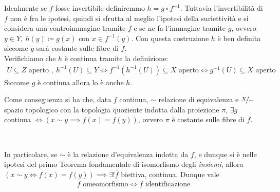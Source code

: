 \begin{demonstration}
	Idealmente se $f$ fosse invertibile definiremmo $h=g\circ f^{-1}$. Tuttavia l'invertibilità di $f$ non è fra le ipotesi, quindi si sfrutta al meglio l'ipotesi della suriettività e si considera una controimmagine tramite $f$ e se ne fa l'immagine tramite $g$, ovvero $y\in Y, \ h(y)\coloneqq g(x)$ con $x\in f^{-1}(y)$. Con questa costruzione $h$ è ben definita siccome $g$ sarà costante sulle fibre di $f$. \\
	Verifichiamo che $h$ è continua tramite la definizione:
		\begin{gather*}
			U\subseteq Z \text{ aperto }, \ h^{-1}(U)\subseteq Y \iff f^{-1}(h^{-1}(U))\subseteq X \text{ aperto} \iff g^{-1}(U)\subseteq X \text{ aperto}
		\end{gather*}
	Siccome $g$ è continua allora lo è anche $h$.
\end{demonstration}
\begin{minipage}[t]{0.83\textwidth} \label{proprietà identificazione quoziente e mappa continua indotta}
Come conseguenza si ha che, data $f$ continua, $\sim$ relazione di equivalenza e $\nicefrac{X}{\sim}$ spazio topologico con la topologia quoziente indotta dalla proiezione $\pi$, $\exists g$ continua $\iff \left( x\sim y \implies f(x)=f(y) \right)$, ovvero $\pi$ è costante sulle fibre di $f$.
\end{minipage}
\begin{minipage}[t]{0.16\textwidth}\vspace{-10pt}
	\end{minipage}\\
\hspace{-1mm}
\begin{minipage}[t]{0.83\textwidth}\vspace{2mm}
In particolare, se $\sim$ è la relazione d'equivalenza indotta da $f$, e dunque si è nelle ipotesi del primo Teorema fondamentale di isomorfismo degli \textit{insiemi}, allora $\left( x\sim y \iff f(x)=f(y) \right) \implies \exists ! \overline{f}$ biettiva, continua. Dunque vale 
		\begin{equation}
				\overline{f} \text{ omeomorfismo} \iff f \text{ identificazione}
			\end{equation}
	 	\end{minipage}
